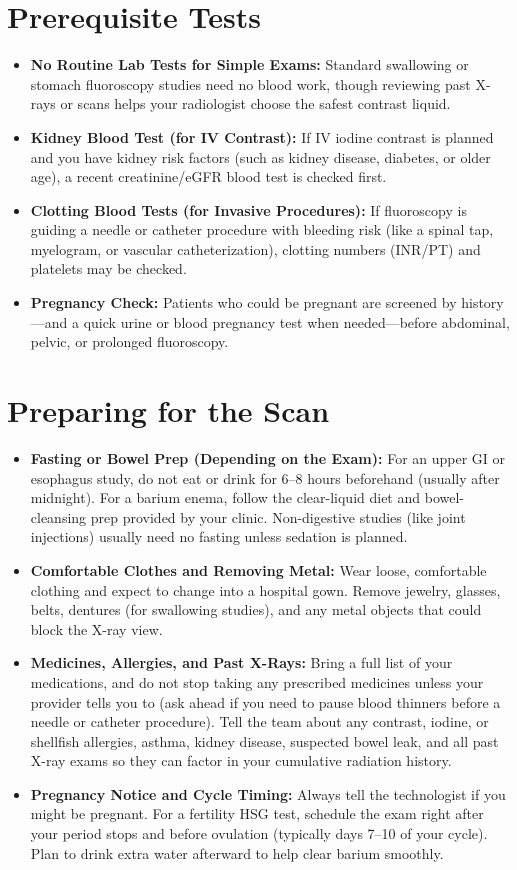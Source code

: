 \section{Prerequisite Tests}

\begin{itemize}
    \item \textbf{No Routine Lab Tests for Simple Exams:} Standard swallowing or stomach fluoroscopy studies need no blood work, though reviewing past X-rays or scans helps your radiologist choose the safest contrast liquid.
    \item \textbf{Kidney Blood Test (for IV Contrast):} If IV iodine contrast is planned and you have kidney risk factors (such as kidney disease, diabetes, or older age), a recent creatinine/eGFR blood test is checked first.
    \item \textbf{Clotting Blood Tests (for Invasive Procedures):} If fluoroscopy is guiding a needle or catheter procedure with bleeding risk (like a spinal tap, myelogram, or vascular catheterization), clotting numbers (INR/PT) and platelets may be checked.
    \item \textbf{Pregnancy Check:} Patients who could be pregnant are screened by history---and a quick urine or blood pregnancy test when needed---before abdominal, pelvic, or prolonged fluoroscopy.
\end{itemize}

\section{Preparing for the Scan}

\begin{itemize}
    \item \textbf{Fasting or Bowel Prep (Depending on the Exam):} For an upper GI or esophagus study, do not eat or drink for 6--8 hours beforehand (usually after midnight). For a barium enema, follow the clear-liquid diet and bowel-cleansing prep provided by your clinic. Non-digestive studies (like joint injections) usually need no fasting unless sedation is planned.
    \item \textbf{Comfortable Clothes and Removing Metal:} Wear loose, comfortable clothing and expect to change into a hospital gown. Remove jewelry, glasses, belts, dentures (for swallowing studies), and any metal objects that could block the X-ray view.
    \item \textbf{Medicines, Allergies, and Past X-Rays:} Bring a full list of your medications, and do not stop taking any prescribed medicines unless your provider tells you to (ask ahead if you need to pause blood thinners before a needle or catheter procedure). Tell the team about any contrast, iodine, or shellfish allergies, asthma, kidney disease, suspected bowel leak, and all past X-ray exams so they can factor in your cumulative radiation history.
    \item \textbf{Pregnancy Notice and Cycle Timing:} Always tell the technologist if you might be pregnant. For a fertility HSG test, schedule the exam right after your period stops and before ovulation (typically days 7--10 of your cycle). Plan to drink extra water afterward to help clear barium smoothly.
\end{itemize}

